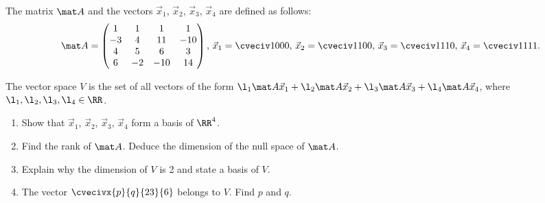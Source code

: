 \begin{problem}
    The matrix $\mat A$ and the vectors $\vec x_1$, $\vec x_2$, $\vec x_3$, $\vec x_4$ are defined as follows: \[\mat A = \begin{pmatrix}1 & 1 & 1 & 1 \\ -3 & 4 & 11 & -10 \\ 4 & 5 & 6 & 3 \\ 6 & -2 & -10 & 14\end{pmatrix}, \, \vec x_1 = \cveciv1000, \, \vec x_2 = \cveciv1100, \, \vec x_3 = \cveciv1110, \, \vec x_4 = \cveciv1111.\]

    The vector space $V$ is the set of all vectors of the form $\l_1 \mat A \vec x_1 + \l_2 \mat A \vec x_2 + \l_3 \mat A \vec x_3 + \l_4 \mat A \vec x_4$, where $\l_1, \l_2, \l_3, \l_4 \in \RR$.

    \begin{enumerate}
        \item Show that $\vec x_1$, $\vec x_2$, $\vec x_3$, $\vec x_4$ form a basis of $\RR^4$.
        \item Find the rank of $\mat A$. Deduce the dimension of the null space of $\mat A$.
        \item Explain why the dimension of $V$ is 2 and state a basis of $V$.
        \item The vector $\cvecivx{p}{q}{23}{6}$ belongs to $V$. Find $p$ and $q$.
    \end{enumerate}
\end{problem}
